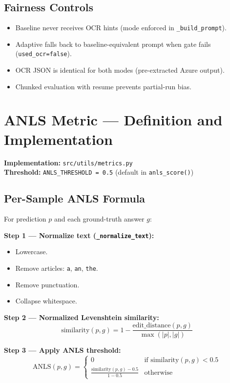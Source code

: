 \documentclass[11pt,a4paper]{article}
\begin{document}
\subsection{Fairness Controls}
\begin{itemize}
    \item Baseline never receives OCR hints (mode enforced in \texttt{\_build\_prompt}).
    \item Adaptive falls back to baseline-equivalent prompt when gate fails (\texttt{used\_ocr=false}).
    \item OCR JSON is identical for both modes (pre-extracted Azure output).
    \item Chunked evaluation with resume prevents partial-run bias.
\end{itemize}

\newpage
\section{ANLS Metric --- Definition and Implementation}
\textbf{Implementation:} \texttt{src/utils/metrics.py} \\
\textbf{Threshold:} \texttt{ANLS\_THRESHOLD = 0.5} (default in \texttt{anls\_score()})

\subsection{Per-Sample ANLS Formula}
For prediction $p$ and each ground-truth answer $g$:

\noindent\textbf{Step 1 --- Normalize text (\texttt{\_normalize\_text}):}
\begin{itemize}
    \item Lowercase.
    \item Remove articles: \texttt{a}, \texttt{an}, \texttt{the}.
    \item Remove punctuation.
    \item Collapse whitespace.
\end{itemize}

\noindent\textbf{Step 2 --- Normalized Levenshtein similarity:}
\begin{equation}
\text{similarity}(p, g) = 1 - \frac{\text{edit\_distance}(p, g)}{\max(|p|, |g|)}
\end{equation}

\noindent\textbf{Step 3 --- Apply ANLS threshold:}
\begin{equation}
\text{ANLS}(p, g) = \begin{cases} 
0 & \text{if } \text{similarity}(p, g) < 0.5 \\ 
\frac{\text{similarity}(p, g) - 0.5}{1 - 0.5} & \text{otherwise} 
\end{cases}
\end{equation}
\end{document}
